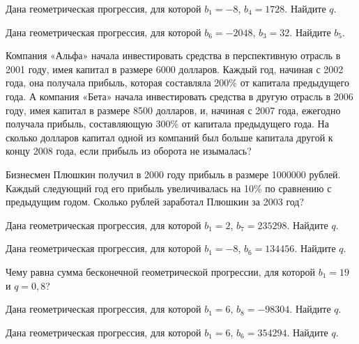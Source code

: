 \documentclass[4apaper]{article}
\begin{document}
\begin{taskBN}{83}
Дана геометрическая прогрессия, для которой $b_1 = -8$, $b_{4}=1728$. Найдите $q$.
\end{taskBN}

\begin{taskBN}{84}
Дана геометрическая прогрессия, для которой $b_{6} = -2048$, $b_{3}=32$. Найдите $b_{5}$.
\end{taskBN}

\begin{taskBN}{85}
Компания «Альфа» начала инвестировать средства в перспективную отрасль в 2001 году, имея капитал в размере 6000 долларов. Каждый год, начиная с 2002 года, она получала прибыль, которая составляла 200\% от капитала предыдущего года. А компания «Бета» начала инвестировать средства в другую отрасль в 2006 году, имея капитал в размере 8500 долларов, и, начиная с 2007 года, ежегодно получала прибыль, составляющую 300\% от капитала предыдущего года. На сколько долларов капитал одной из компаний был больше капитала другой к концу 2008 года, если прибыль из оборота не изымалась?
\end{taskBN}

\begin{taskBN}{86}
Бизнесмен Плюшкин получил в 2000 году прибыль в размере 1000000 рублей. Каждый следующий год его прибыль увеличивалась на 10\% по сравнению с предыдущим годом. Сколько рублей заработал Плюшкин за 2003 год?
\end{taskBN}

\begin{taskBN}{87}
Дана геометрическая прогрессия, для которой $b_1 = 2$, $b_{7}=235298$. Найдите $q$.
\end{taskBN}

\begin{taskBN}{88}
Дана геометрическая прогрессия, для которой $b_1 = -8$, $b_{6}=134456$. Найдите $q$.
\end{taskBN}

\begin{taskBN}{89}
Чему равна сумма бесконечной геометрической прогрессии, для которой $b_1 = 19$ и $q=0,8$?
\end{taskBN}

\begin{taskBN}{90}
Дана геометрическая прогрессия, для которой $b_1 = 6$, $b_{8}=-98304$. Найдите $q$.
\end{taskBN}

\begin{taskBN}{91}
Дана геометрическая прогрессия, для которой $b_1 = 6$, $b_{6}=354294$. Найдите $q$.
\end{taskBN}
\end{document}
